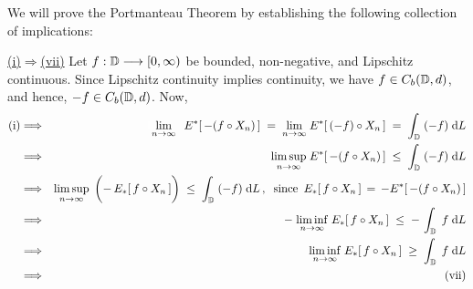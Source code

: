 \proof
We will prove the Portmanteau Theorem by establishing the following collection
of implications:
\begin{center}
\end{center}

\vskip 0.0cm \noindent
\underline{(i)\;$\Longrightarrow$\;(vii)}
\vskip 0.2cm \noindent
Let $f : \mathbb{D} \longrightarrow [0,\infty)$ be bounded, non-negative, and Lipschitz continuous.
Since Lipschitz continuity implies continuity, we have $f \in C_{b}(\mathbb{D},d)$, and hence, $-f \in C_{b}(\mathbb{D},d)$.
Now,
\begin{eqnarray*}
\textnormal{(i)}
&\Longrightarrow&
	{\color{white}1}\underset{n\rightarrow\infty}{\lim}\;\;\,E^{*}\!\left[\,-(f \circ X_{n})\,\right]
	\;=\; \underset{n\rightarrow\infty}{\lim}\;E^{*}\!\left[\,(-f) \circ X_{n}\,\right]
	\;=\; \int_{\D}\;(-f)\;\d L
\\
&\Longrightarrow&
	\underset{n\rightarrow\infty}{\limsup}\;E^{*}\!\left[\,-(f \circ X_{n})\,\right] \;\leq\; \int_{\D}\;(-f)\;\d L
\\
&\Longrightarrow&
	\underset{n\rightarrow\infty}{\limsup}\;
	\left(\overset{{\color{white}\vert}}{-}\,E_{*}\!\left[\,f \circ X_{n}\,\right]\right) \;\leq\; \int_{\D}\;(-f)\;\d L\,,
	\;\;\textnormal{since \,$E_{*}[\,f \circ X_{n}\,] \,=\, -E^{*}[\,-(f \circ X_{n})\,]$}
\\
&\Longrightarrow&
	-\;\underset{n\rightarrow\infty}{\liminf}\;E_{*}\!\left[\,f \circ X_{n}\,\right]
	\;\leq\; -\,\int_{\D}\;f\;\d L
\\
&\Longrightarrow&
	\underset{n\rightarrow\infty}{\liminf}\;E_{*}\!\left[\,f \circ X_{n}\,\right]
	\;\geq\; \int_{\D}\;f\;\d L
\\
&\Longrightarrow&
	\textnormal{(vii)}
\end{eqnarray*}


